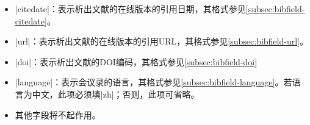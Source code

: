 \begin{itemize}
\item |citedate|：表示析出文献的在线版本的引用日期，其格式参见\ref{subsec:bibfield-citedate}。
\item |url|：表示析出文献的在线版本的引用URL，其格式参见\ref{subsec:bibfield-url}。
\item |doi|：表示析出文献的DOI编码，其格式参见\ref{subsec:bibfield-doi}
\item |language|：表示会议录的语言，其格式参见\ref{subsec:bibfield-language}。若语
  言为中文，此项必须填|zh|；否则，此项可省略。
\item 其他字段将不起作用。
\end{itemize}